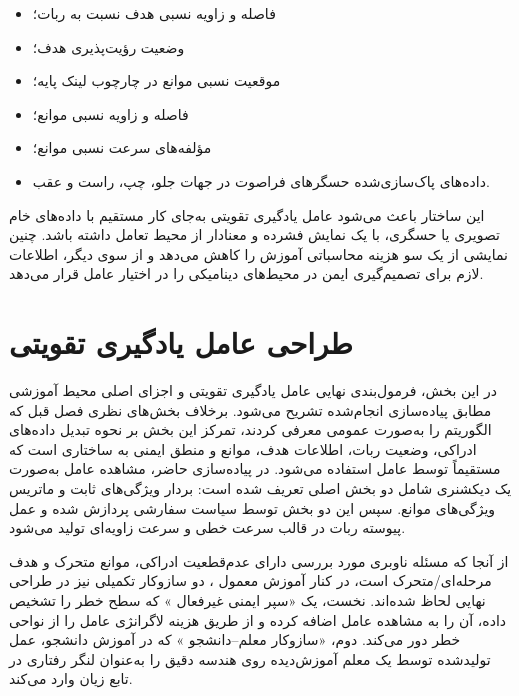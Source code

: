 \begin{itemize}
	\item فاصله و زاویه نسبی هدف نسبت به ربات؛
	\item وضعیت رؤیت‌پذیری هدف؛
	\item موقعیت نسبی موانع در چارچوب لینک پایه؛
	\item فاصله و زاویه نسبی موانع؛
	\item مؤلفه‌های سرعت نسبی موانع؛
	\item داده‌های پاک‌سازی‌شده حسگرهای فراصوت در جهات جلو، چپ، راست و عقب.
\end{itemize}

این ساختار باعث می‌شود عامل یادگیری تقویتی به‌جای کار مستقیم با داده‌های خام تصویری یا حسگری، با یک نمایش فشرده و معنادار از محیط تعامل داشته باشد. چنین نمایشی از یک سو هزینه محاسباتی آموزش را کاهش می‌دهد و از سوی دیگر، اطلاعات لازم برای تصمیم‌گیری ایمن در محیط‌های دینامیکی را در اختیار عامل قرار می‌دهد.
\section{طراحی عامل یادگیری تقویتی}
\label{sec:rl_agent_design}

در این بخش، فرمول‌بندی نهایی عامل یادگیری تقویتی و اجزای اصلی محیط آموزشی مطابق پیاده‌سازی انجام‌شده تشریح می‌شود. برخلاف بخش‌های نظری فصل قبل که الگوریتم  را به‌صورت عمومی معرفی کردند، تمرکز این بخش بر نحوه تبدیل داده‌های ادراکی، وضعیت ربات، اطلاعات هدف، موانع و منطق ایمنی به ساختاری است که مستقیماً توسط عامل استفاده می‌شود. در پیاده‌سازی حاضر، مشاهده عامل به‌صورت یک دیکشنری شامل دو بخش اصلی تعریف شده است: بردار ویژگی‌های ثابت و ماتریس ویژگی‌های موانع. سپس این دو بخش توسط سیاست سفارشی  پردازش شده و عمل پیوسته ربات در قالب سرعت خطی و سرعت زاویه‌ای تولید می‌شود.

از آنجا که مسئله ناوبری مورد بررسی دارای عدم‌قطعیت ادراکی، موانع متحرک و هدف مرحله‌ای/متحرک است، در کنار آموزش معمول ، دو سازوکار تکمیلی نیز در طراحی نهایی لحاظ شده‌اند. نخست، یک «سپر ایمنی غیرفعال%
» %
 که سطح خطر را تشخیص داده، آن را به مشاهده عامل اضافه کرده و از طریق هزینه لاگرانژی عامل را از نواحی خطر دور می‌کند. دوم، «سازوکار معلم--دانشجو%
 » %
  که در آموزش دانشجو، عمل تولیدشده توسط یک معلم آموزش‌دیده روی هندسه دقیق را به‌عنوان لنگر رفتاری در تابع زیان وارد می‌کند.

